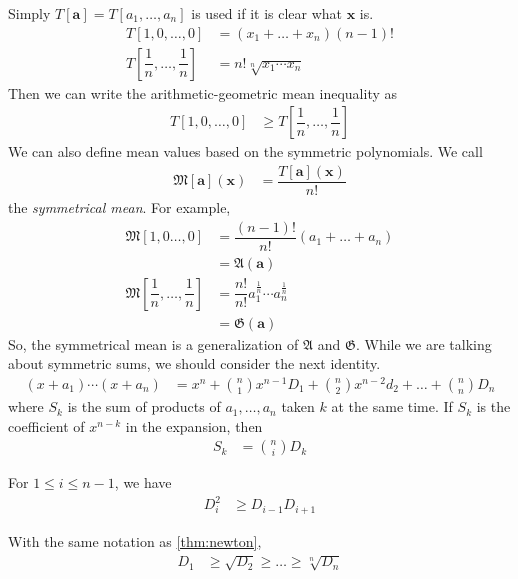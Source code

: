 \documentclass{subfile}
\begin{document}
	Simply $T[\mathbf{a}]=T[a_{1},\ldots,a_{n}]$ is used if it is clear what $\mathbf{x}$ is.
		\begin{align*}
			T[1,0,\ldots,0]
				& = (x_{1}+\ldots+x_{n})(n-1)!\\
			T\left[\dfrac{1}{n},\ldots,\dfrac{1}{n}\right]
				& = n!\sqrt[n]{x_{1}\cdots x_{n}}
		\end{align*}
	Then we can write the arithmetic-geometric mean inequality as
		\begin{align*}
			T[1,0,\ldots,0]
				& \geq T\left[\dfrac{1}{n},\ldots,\dfrac{1}{n}\right]
		\end{align*}
	We can also define mean values based on the symmetric polynomials. We call
		\begin{align*}
			\mathfrak{M}[\mathbf{a}](\mathbf{x})
				& = \dfrac{T[\mathbf{a}](\mathbf{x})}{n!}
		\end{align*}
	the \textit{symmetrical mean}. For example,
		\begin{align*}
			\mathfrak{M}[1,0\ldots,0]
				& = \dfrac{(n-1)!}{n!}(a_{1}+\ldots+a_{n})\\
				& = \mathfrak{A}(\mathbf{a})\\
			\mathfrak{M}\left[\dfrac{1}{n},\ldots,\dfrac{1}{n}\right]
				& = \dfrac{n!}{n!}a_{1}^{\frac{1}{n}}\cdots a_{n}^{\frac{1}{n}}\\
				& = \mathfrak{G}(\mathbf{a})
		\end{align*}
	So, the symmetrical mean is a generalization of $\mathfrak{A}$ and $\mathfrak{G}$. While we are talking about symmetric sums, we should consider the next identity.
		\begin{align*}
			(x+a_{1})\cdots(x+a_{n})
				& = x^{n}+\binom{n}{1}x^{n-1}D_{1}+\binom{n}{2}x^{n-2}d_{2}+\ldots+\binom{n}{n}D_{n}
		\end{align*}
	where $S_{k}$ is the sum of products of $a_{1},\ldots,a_{n}$ taken $k$ at the same time. If $S_{k}$ is the coefficient of $x^{n-k}$ in the expansion, then
		\begin{align*}
			S_{k}
				& = \binom{n}{i}D_{k}
		\end{align*}
	
		\begin{theorem}\label{thm:newton}
			For $1\leq i\leq n-1$, we have
				\begin{align*}
					D_{i}^{2}
						& \geq D_{i-1}D_{i+1}
				\end{align*}
		\end{theorem}
	
		\begin{theorem}\label{thm:maclaurin}
			With the same notation as \autoref{thm:newton},
				\begin{align*}
					D_{1}
						& \geq \sqrt{D_{2}}\geq\ldots\geq\sqrt[n]{D_{n}}
				\end{align*}
		\end{theorem}
\end{document}
